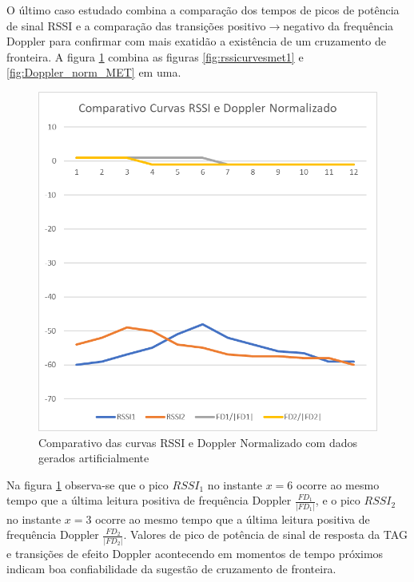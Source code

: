 O último caso estudado combina a comparação dos tempos de picos de potência de sinal RSSI e a comparação das transições positivo$\rightarrow$negativo da frequência Doppler para confirmar com mais exatidão a existência de um cruzamento de fronteira. A figura \ref{fig:RSSI_Doppler_norm_MET} combina as figuras \ref{fig:rssicurvesmet1} e \ref{fig:Doppler_norm_MET} em uma.

   \begin{figure}[h]
    \centering
    \includegraphics[width=0.8\linewidth]{figs/Metodologia/image009.png}
    \caption{Comparativo das curvas RSSI e Doppler Normalizado com dados gerados artificialmente}
    \label{fig:RSSI_Doppler_norm_MET}
\end{figure}

Na figura \ref{fig:RSSI_Doppler_norm_MET} observa-se que o pico $RSSI_1$ no instante $x=6$ ocorre ao mesmo tempo que a última leitura positiva de frequência Doppler $\frac{FD_1}{|FD_1|}$, e o pico $RSSI_2$ no instante $x=3$ ocorre ao mesmo tempo que a última leitura positiva de frequência Doppler $\frac{FD_2}{|FD_2|}$. Valores de pico de potência de sinal de resposta da TAG e transições de efeito Doppler acontecendo em momentos de tempo próximos indicam boa confiabilidade da sugestão de cruzamento de fronteira.